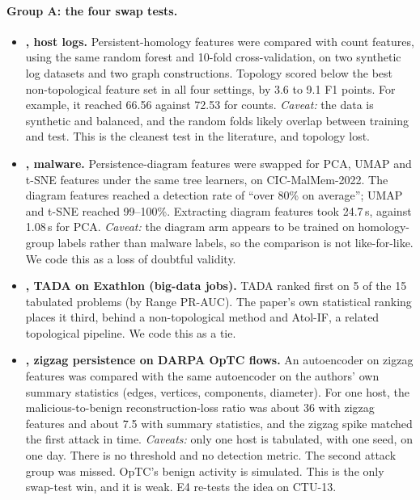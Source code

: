 \paragraph{Group A: the four swap tests.}
\begin{itemize}
  \item \textbf{, host logs.} Persistent-homology features were compared with count features, using the same random forest and 10-fold cross-validation, on two synthetic log datasets and two graph constructions. Topology scored below the best non-topological feature set in all four settings, by 3.6 to 9.1 F1 points. For example, it reached 66.56 against 72.53 for counts.
    \emph{Caveat:} the data is synthetic and balanced, and the random folds likely overlap between training and test.
    This is the cleanest test in the literature, and topology lost.
  \item \textbf{, malware.} Persistence-diagram features were swapped for PCA, UMAP and t-SNE features under the same tree learners, on CIC-MalMem-2022. The diagram features reached a detection rate of ``over 80\% on average''; UMAP and t-SNE reached 99--100\%. Extracting diagram features took 24.7\,s, against 1.08\,s for PCA.
    \emph{Caveat:} the diagram arm appears to be trained on homology-group labels rather than malware labels, so the comparison is not like-for-like.
    We code this as a loss of doubtful validity.
  \item \textbf{, TADA on Exathlon (big-data jobs).} TADA ranked first on 5 of the 15 tabulated problems (by Range PR-AUC). The paper's own statistical ranking places it third, behind a non-topological method and Atol-IF, a related topological pipeline. We code this as a tie.
  \item \textbf{, zigzag persistence on DARPA OpTC flows.} An autoencoder on zigzag features was compared with the same autoencoder on the authors' own summary statistics (edges, vertices, components, diameter). For one host, the malicious-to-benign reconstruction-loss ratio was about 36 with zigzag features and about 7.5 with summary statistics, and the zigzag spike matched the first attack in time.
    \emph{Caveats:} only one host is tabulated, with one seed, on one day. There is no threshold and no detection metric. The second attack group was missed. OpTC's benign activity is simulated.
    This is the only swap-test win, and it is weak. E4 re-tests the idea on CTU-13.
\end{itemize}

